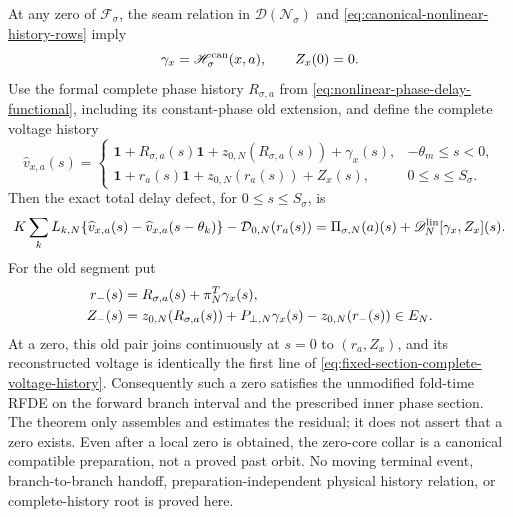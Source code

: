 \begin{theorem}
At any zero of \(\mathcal F_\sigma\), the seam relation in
\(\mathcal D(\mathscr N_\sigma)\) and
\cref{eq:canonical-nonlinear-history-rows} imply
\[
 \gamma_x=\mathscr H_\sigma^{\rm can}(x,a),
 \qquad Z_x(0)=0.
\]
Use the formal complete phase history
\(R_{\sigma,a}\) from
\cref{eq:nonlinear-phase-delay-functional}, including its constant-phase
old extension, and define the complete voltage history
\begin{equation}
 \widehat v_{x,a}(s)=
 \begin{cases}
  \mathbf1+R_{\sigma,a}(s)\mathbf1
       +z_{0,N}(R_{\sigma,a}(s))+\gamma_x(s),
       &-\theta_m\le s<0,\\
  \mathbf1+r_a(s)\mathbf1+z_{0,N}(r_a(s))+Z_x(s),
       &0\le s\le S_\sigma.
 \end{cases}                                      \label{eq:fixed-section-complete-voltage-history}
\end{equation}
Then the exact total delay defect, for \(0\le s\le S_\sigma\), is
\begin{equation}
 K\sum_kL_{k,N}
   \{\widehat v_{x,a}(s)-\widehat v_{x,a}(s-\theta_k)\}
       -\mathcal D_{0,N}(r_a(s))
 =\Pi_{\sigma,N}(a)(s)
       +\mathscr D_N^{\rm lin}[\gamma_x,Z_x](s). \label{eq:fixed-section-exact-delay-splitting}
\end{equation}
For the old segment put
\begin{align}
 r_-(s)
 &=R_{\sigma,a}(s)+\pi_N^T\gamma_x(s),\notag\\
 Z_-(s)
 &=z_{0,N}(R_{\sigma,a}(s))+P_{\perp,N}\gamma_x(s)
       -z_{0,N}(r_-(s))\in E_N.                  \label{eq:fixed-section-physical-old-decomposition}
\end{align}
At a zero, this old pair joins continuously at \(s=0\) to
\((r_a,Z_x)\), and its reconstructed voltage is identically the first
line of \cref{eq:fixed-section-complete-voltage-history}.  Consequently
such a zero satisfies the unmodified fold-time RFDE on the forward branch
interval and the prescribed inner phase section.  The theorem only
assembles and estimates the residual; it does not assert that a zero
exists.  Even after a local zero is obtained, the zero-core collar is a
canonical compatible preparation, not a proved past orbit.  No moving
terminal event, branch-to-branch handoff, preparation-independent physical
history relation, or complete-history root is proved here.
\end{theorem}

